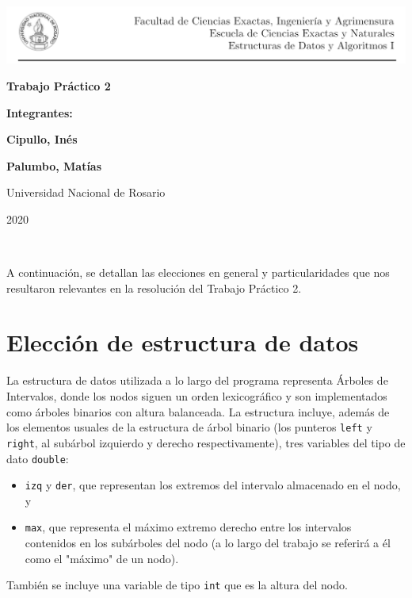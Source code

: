 \documentclass[11pt]{article}
\begin{document}
\begin{titlepage}
    \hspace{-1.2cm}\includegraphics[scale= 0.8]{header2}
    \begin{center}
        \vfill
        \vfill
            \vspace{0.7cm}
            \noindent\textbf{\Huge Trabajo Práctico 2}\par
            \vspace{.5cm}
        \vfill
        \noindent \textbf{\huge Integrantes:}\par
        \vspace{.5cm}
        \noindent \textbf{\Large Cipullo, Inés}\par
        \noindent \textbf{\Large Palumbo, Matías}\par
 
        \vfill
        \large Universidad Nacional de Rosario \par
        \noindent\large 2020
    \end{center}
 \end{titlepage}
 \ \par


\noindent A continuación, se detallan las elecciones en general y particularidades que nos resultaron relevantes en la resolución del Trabajo Práctico 2.\par


\section{Elección de estructura de datos}

La estructura de datos utilizada a lo largo del programa representa Árboles de Intervalos, donde los nodos siguen un orden lexicográfico y son implementados como árboles binarios con altura balanceada.
La estructura incluye, además de los elementos usuales de la estructura de árbol binario (los punteros \verb|left| y \verb|right|, al subárbol izquierdo y derecho respectivamente), 
tres variables del tipo de dato \verb|double|:
\begin{itemize}
    \item \verb|izq| y \verb|der|, que representan los extremos del intervalo almacenado en el nodo, y
    \item \verb|max|, que representa el máximo extremo derecho entre los intervalos contenidos en los subárboles del nodo (a lo largo del trabajo se referirá a él como el "máximo" de un nodo).
\end{itemize}
También se incluye una variable de tipo \verb|int| que es la altura del nodo.\par
\end{document}
